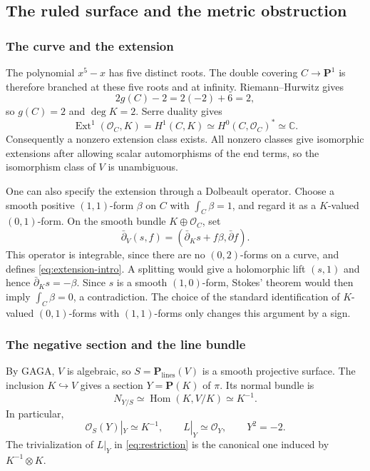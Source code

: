 \documentclass[11pt]{amsart}
\theoremstyle{definition}
\theoremstyle{remark}
\numberwithin{equation}{section}
\newcommand{\C}{\mathbb C}
\newcommand{\PP}{\mathbf P}
\newcommand{\OO}{\mathcal O}
\newcommand{\barp}{\bar\partial}
\begin{document}
\subsection{The ruled surface and the metric obstruction}\label{sec:ruled}

\subsubsection{The curve and the extension}

The polynomial $x^5-x$ has five distinct roots. The double covering
$C\to\PP^1$ is therefore branched at these five roots and at infinity.
Riemann--Hurwitz gives
\[
 2g(C)-2=2(-2)+6=2,
\]
so $g(C)=2$ and $\deg K=2$. Serre duality gives
\[
 \operatorname{Ext}^1(\OO_C,K)=H^1(C,K)
 \simeq H^0(C,\OO_C)^*\simeq\C.
\]
Consequently a nonzero extension class exists. All nonzero classes give
isomorphic extensions after allowing scalar automorphisms of the end
terms, so the isomorphism class of $V$ is unambiguous.

One can also specify the extension through a Dolbeault operator. Choose
a smooth positive $(1,1)$-form $\beta$ on $C$ with
$\int_C\beta=1$, and regard it as a $K$-valued $(0,1)$-form. On the
smooth bundle $K\oplus\OO_C$, set
\begin{equation}\label{eq:dolbeault-extension}
 \barp_V(s,f)=(\barp_Ks+f\beta,\barp f).
\end{equation}
This operator is integrable, since there are no $(0,2)$-forms on a
curve, and defines \eqref{eq:extension-intro}. A splitting would give a
holomorphic lift $(s,1)$ and hence $\barp_Ks=-\beta$. Since $s$ is a
smooth $(1,0)$-form, Stokes' theorem would then imply
$\int_C\beta=0$, a contradiction. The choice of the standard
identification of $K$-valued $(0,1)$-forms with $(1,1)$-forms only changes
this argument by a sign.

\subsubsection{The negative section and the line bundle}

By GAGA, $V$ is algebraic, so $S=\PP_{\mathrm{lines}}(V)$ is a smooth
projective surface. The inclusion $K\hookrightarrow V$ gives a section
$Y=\PP(K)$ of $\pi$. Its normal bundle is
\begin{equation}\label{eq:normal}
 N_{Y/S}\simeq\operatorname{Hom}(K,V/K)\simeq K^{-1}.
\end{equation}
In particular,
\begin{equation}\label{eq:restriction}
 \OO_S(Y)|_Y\simeq K^{-1},\qquad
 L|_Y\simeq\OO_Y,\qquad Y^2=-2.
\end{equation}
The trivialization of $L|_Y$ in \eqref{eq:restriction} is the canonical
one induced by $K^{-1}\otimes K$.
\end{document}
